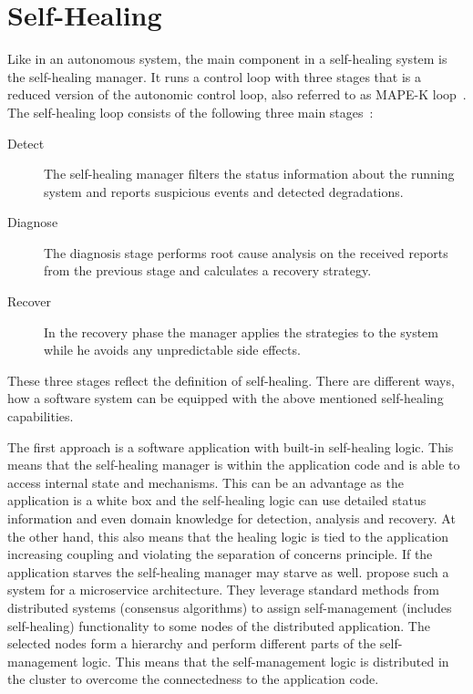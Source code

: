
\section{Self-Healing}
  Like in an autonomous system, the main component in a self-healing system is the self-healing manager.
  It runs a control loop with three stages that is a reduced version of the autonomic control loop, also referred to as MAPE-K loop~\cite{ibm_autonomic}.
  The self-healing loop consists of the following three main stages~\cite{PsaierSurvey}:

  \begin{description}
    \item[Detect] The self-healing manager filters the status information about the running system and reports suspicious events and detected degradations.
    \item[Diagnose] The diagnosis stage performs root cause analysis on the received reports from the previous stage and calculates a recovery strategy.
    \item[Recover] In the recovery phase the manager applies the strategies to the system while he avoids any unpredictable side effects.
  \end{description}

  These three stages reflect the definition of self-healing.
  There are different ways, how a software system can be equipped with the above mentioned self-healing capabilities.

  The first approach is a software application with built-in self-healing logic.
  This means that the self-healing manager is within the application code and is able to access internal state and mechanisms.
  This can be an advantage as the application is a white box and the self-healing logic can use detailed status information and even domain knowledge for detection, analysis and recovery.
  At the other hand, this also means that the healing logic is tied to the application increasing coupling and violating the separation of concerns principle.
  If the application starves the self-healing manager may starve as well.
  \citeauthor{ToffettiMicroservices} propose such a system for a microservice architecture.
  They leverage standard methods from distributed systems (\ie consensus algorithms) to assign self-management (includes self-healing) functionality to some nodes of the distributed application.
  The selected nodes form a hierarchy and perform different parts of the self-management logic.
  This means that the self-management logic is distributed in the cluster to overcome the connectedness to the application code.

